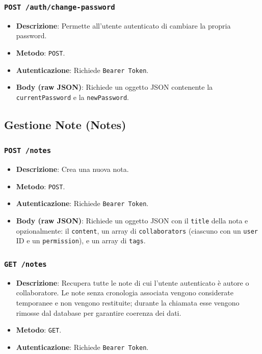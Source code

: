 \documentclass[11pt]{article}
\begin{document}
\subsubsection{\texttt{POST /auth/change-password}}
\begin{itemize}
    \item \textbf{Descrizione}: Permette all'utente autenticato di cambiare la propria password.
    \item \textbf{Metodo}: \texttt{POST}.
    \item \textbf{Autenticazione}: Richiede \texttt{Bearer Token}.
    \item \textbf{Body (raw JSON)}: Richiede un oggetto JSON contenente la \texttt{currentPassword} e la \texttt{newPassword}.
\end{itemize}

\subsection{Gestione Note (Notes)}
\subsubsection{\texttt{POST /notes}}
\begin{itemize}
    \item \textbf{Descrizione}: Crea una nuova nota.
    \item \textbf{Metodo}: \texttt{POST}.
    \item \textbf{Autenticazione}: Richiede \texttt{Bearer Token}.
    \item \textbf{Body (raw JSON)}: Richiede un oggetto JSON con il \texttt{title} della nota e opzionalmente: il \texttt{content}, un array di \texttt{collaborators} (ciascuno con un \texttt{user} ID e un \texttt{permission}), e un array di \texttt{tags}.
\end{itemize}

\subsubsection{\texttt{GET /notes}}
\begin{itemize}
    \item \textbf{Descrizione}: Recupera tutte le note di cui l’utente autenticato è autore o collaboratore. 
    Le note senza cronologia associata vengono considerate temporanee e non vengono restituite; 
    durante la chiamata esse vengono rimosse dal database per garantire coerenza dei dati.
    \item \textbf{Metodo}: \texttt{GET}.
    \item \textbf{Autenticazione}: Richiede \texttt{Bearer Token}.
\end{itemize}
\end{document}
